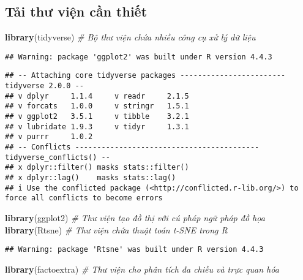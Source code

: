 \documentclass[
]{article}
\newenvironment{Shaded}{\begin{snugshade}}{\end{snugshade}}
\newcommand{\CommentTok}[1]{\textcolor[rgb]{0.56,0.35,0.01}{\textit{#1}}}
\newcommand{\FunctionTok}[1]{\textcolor[rgb]{0.13,0.29,0.53}{\textbf{#1}}}
\newcommand{\NormalTok}[1]{#1}
\begin{document}
\subsection{Tải thư viện cần
thiết}\label{tux1ea3i-thux1b0-viux1ec7n-cux1ea7n-thiux1ebft}

\begin{Shaded}
\begin{Highlighting}[]
\FunctionTok{library}\NormalTok{(tidyverse)   }\CommentTok{\# Bộ thư viện chứa nhiều công cụ xử lý dữ liệu}
\end{Highlighting}
\end{Shaded}

\begin{verbatim}
## Warning: package 'ggplot2' was built under R version 4.4.3
\end{verbatim}

\begin{verbatim}
## -- Attaching core tidyverse packages ------------------------ tidyverse 2.0.0 --
## v dplyr     1.1.4     v readr     2.1.5
## v forcats   1.0.0     v stringr   1.5.1
## v ggplot2   3.5.1     v tibble    3.2.1
## v lubridate 1.9.3     v tidyr     1.3.1
## v purrr     1.0.2     
## -- Conflicts ------------------------------------------ tidyverse_conflicts() --
## x dplyr::filter() masks stats::filter()
## x dplyr::lag()    masks stats::lag()
## i Use the conflicted package (<http://conflicted.r-lib.org/>) to force all conflicts to become errors
\end{verbatim}

\begin{Shaded}
\begin{Highlighting}[]
\FunctionTok{library}\NormalTok{(ggplot2)     }\CommentTok{\# Thư viện tạo đồ thị với cú pháp ngữ pháp đồ họa}
\FunctionTok{library}\NormalTok{(Rtsne)       }\CommentTok{\# Thư viện chứa thuật toán t{-}SNE trong R}
\end{Highlighting}
\end{Shaded}

\begin{verbatim}
## Warning: package 'Rtsne' was built under R version 4.4.3
\end{verbatim}

\begin{Shaded}
\begin{Highlighting}[]
\FunctionTok{library}\NormalTok{(factoextra)  }\CommentTok{\# Thư viện cho phân tích đa chiều và trực quan hóa}
\end{Highlighting}
\end{Shaded}
\end{document}
